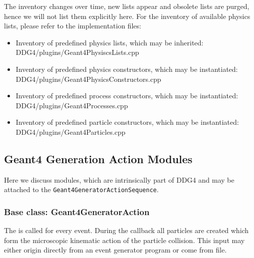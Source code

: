 \documentclass[10pt,a4paper]{article}
\begin{document}
\noindent
The inventory changes over time, new lists appear and obsolete lists are purged,
hence we will not list them explicitly here.
For the inventory of available physics lists, please refer to the implementation files:

\noindent
\begin{itemize}\itemcompact
\item Inventory of predefined physics lists, which may be inherited:\\
{DDG4/plugins/Geant4PhysiscsLists.cpp}
\item Inventory of predefined physics constructors, which may be instantiated:\\
{DDG4/plugins/Geant4PhysicsConstructors.cpp}
\item Inventory of predefined process constructors, which may be instantiated:\\
{DDG4/plugins/Geant4Processes.cpp}
\item Inventory of predefined particle constructors, which may be instantiated:\\
{DDG4/plugins/Geant4Particles.cpp}
\end{itemize}
\newpage

\subsection{Geant4 Generation Action Modules}
\noindent
Here we discuss modules, which are intrinsically part of DDG4 and may be
attached to the {\tt{Geant4GeneratorActionSequence}}.

\subsubsection{Base class: Geant4GeneratorAction}
\noindent
The  is called for every event.
During the callback all particles are created which form the 
microscopic kinematic action of the particle collision.
This input may either origin directly from an event generator program
or come from file.
\end{document}
